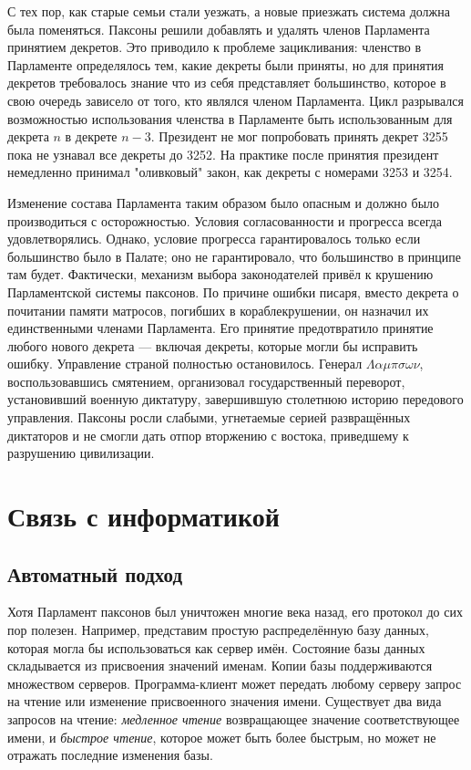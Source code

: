 \documentclass[12pt, a4paper]{article} %
\begin{document}
С тех пор, как старые семьи стали уезжать, а новые приезжать система должна была поменяться. Паксоны решили добавлять и удалять членов Парламента принятием декретов. Это приводило к проблеме зацикливания: членство в Парламенте определялось тем, какие декреты были приняты, но для принятия декретов требовалось знание что из себя представляет большинство, которое в свою очередь зависело от того, кто являлся членом Парламента. Цикл разрывался возможностью использования членства в Парламенте быть использованным для декрета $n$ в декрете $n-3$. Президент не мог попробовать принять декрет 3255 пока не узнавал все декреты до 3252. На практике после принятия 
президент немедленно принимал "оливковый" закон, как декреты с номерами 3253 и 3254.

Изменение состава Парламента таким образом было опасным и должно было производиться с осторожностью. Условия согласованности и прогресса всегда удовлетворялись. Однако, условие прогресса гарантировалось только если большинство было в Палате; оно не гарантировало, что большинство  в принципе там будет. Фактически, механизм выбора законодателей привёл к крушению Парламентской системы паксонов. По причине ошибки писаря, вместо декрета о почитании памяти матросов, погибших в кораблекрушении, он назначил их единственными членами Парламента. Его принятие предотвратило принятие любого нового декрета --- включая декреты, которые могли бы исправить ошибку. Управление страной полностью остановилось. Генерал $\Lambda\alpha\mu\pi\sigma\omega\nu$, воспользовавшись смятением, организовал государственный переворот, установивший военную диктатуру, завершившую столетнюю историю передового управления. Паксоны росли слабыми, угнетаемые серией развращённых диктаторов и не смогли дать отпор вторжению с востока, приведшему к разрушению цивилизации.

\section{Связь с информатикой}\label{sec:csconnection}

\subsection{Автоматный подход}

Хотя Парламент паксонов был уничтожен многие века назад, его протокол до сих пор полезен. Например, представим простую распределённую базу данных, которая могла бы использоваться как сервер имён. Состояние базы данных складывается из присвоения значений именам. Копии базы поддерживаются множеством серверов. Программа-клиент может передать любому серверу запрос на чтение или изменение присвоенного значения имени. Существует два вида запросов на чтение: \textit{медленное чтение} возвращающее значение соответствующее имени, и \textit{быстрое чтение}, которое может быть более быстрым, но может не отражать последние изменения базы.
\end{document}
